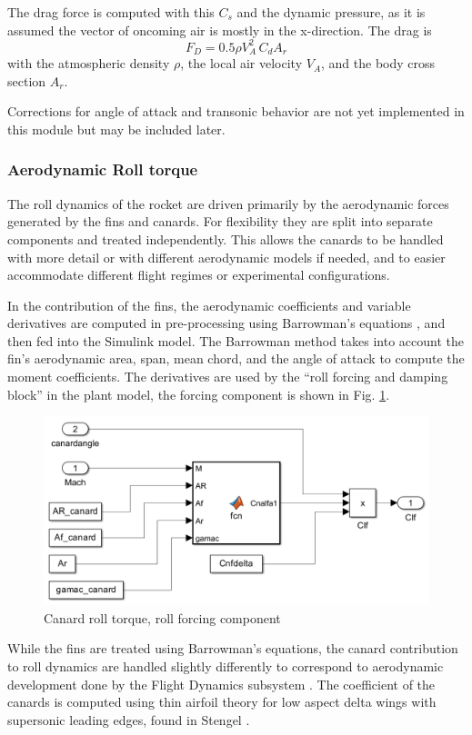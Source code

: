 The drag force is computed with this $C_s$ and the dynamic pressure, as it is assumed the vector of oncoming air is mostly in the x-direction. 
The drag is 
\begin{equation}
    F_D = 0.5 \rho V_{A}^2 \, C_d A_{r}
\end{equation}
with the atmospheric density $\rho$, the local air velocity $V_A$, and the body cross section $A_r$.

 Corrections for angle of attack and transonic behavior are not yet implemented in this module but may be included later. 

\subsubsection{Aerodynamic Roll torque} 
The roll dynamics of the rocket are driven primarily by the aerodynamic forces generated by the fins and canards.
For flexibility they are split into separate components and treated independently. This allows the canards to be handled with more detail or with different aerodynamic models if needed, and to easier accommodate different flight regimes or experimental configurations.

In the contribution of the fins, the aerodynamic coefficients and variable derivatives are computed in pre-processing using Barrowman's equations \cite{barrowman1967}, and then fed into the Simulink model. 
The Barrowman method takes into account the fin's aerodynamic area, span, mean chord, and the angle of attack to compute the moment coefficients.
The derivatives are used by the ``roll forcing and damping block'' in the plant model, the forcing component is shown in Fig. \ref{fig:roll-torque}. 

\begin{figure}[ht]
    \centering
    \includegraphics[width=0.4\linewidth]{images-plant/sim_roll_forcing.png}
    \caption{Canard roll torque, roll forcing component}
    \label{fig:roll-torque}
\end{figure}

While the fins are treated using Barrowman's equations, the canard contribution to roll dynamics are handled slightly differently to correspond to aerodynamic development done by the Flight Dynamics subsystem \cite{team-flight-luca}.
The coefficient of the canards is computed using thin airfoil theory for low aspect delta wings with supersonic leading edges, found in Stengel \cite[p. 73]{stengel2004}.


